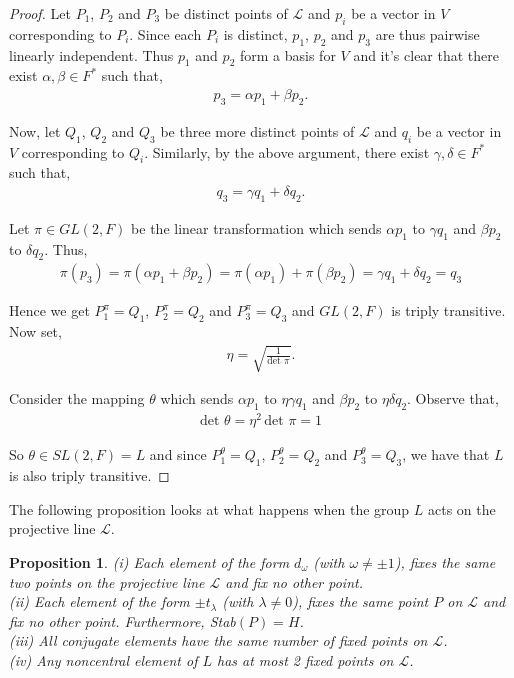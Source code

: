 \documentclass[a4paper , 11pt]{book}
\newtheorem{proposition}[theorem]{Proposition}
\theoremstyle{definition}
\theoremstyle{remark}
\begin{document}
\begin{proof} Let $P_1$, $P_2$ and $P_3$ be distinct points of $\mathscr{L}$ and $p_i$ be a vector in $V$ corresponding to $P_i$. Since each $P_i$ is distinct, $p_1$, $p_2$ and $p_3$ are thus pairwise linearly independent. Thus $p_1$ and $p_2$  form a basis for $V$ and it's clear that there exist $\alpha, \beta \in F^*$ such that,
\begin{align*} p_3 = \alpha p_1 + \beta p_2.
\end{align*}

Now, let $Q_1$, $Q_2$ and $Q_3$ be three more distinct points of $\mathscr{L}$ and $q_i$ be a vector in $V$ corresponding to $Q_i$. Similarly, by the above argument, there exist $\gamma, \delta \in F^*$ such that,
\begin{align*} q_3 = \gamma q_1 + \delta q_2.
\end{align*}

Let $\pi \in GL(2,F)$ be the linear transformation which sends $\alpha p_1$ to $\gamma q_1$  and $\beta p_2$ to $\delta q_2$. Thus,
\begin{align*} \pi(p_3) = \pi(\alpha p_1 + \beta p_2) = \pi(\alpha p_1) + \pi(\beta p_2) = \gamma q_1 + \delta q_2 = q_3 
\end{align*}

Hence we get $P^\pi_1 = Q_1$, $P^\pi_2 = Q_2$ and $P^\pi_3 = Q_3$ and $GL(2,F)$ is triply transitive. Now set,
\begin{align*} \eta = \sqrt{\frac{1}{\text{det }\pi}}.
\end{align*}

Consider the mapping $\theta$ which sends $\alpha p_1$ to $\eta \gamma q_1$ and $\beta p_2$ to $\eta \delta q_2$. Observe that,
\begin{align*} \text{det }\theta = \eta^2 \, \text{det } \pi = 1
\end{align*}

So $\theta \in SL(2,F) = L$ and since $P^\theta_1 = Q_1$, $P^\theta_2 = Q_2$ and $P^\theta_3 = Q_3$, we have that $L$ is also triply transitive. 

\end{proof}

The following proposition looks at what happens when the group $L$ acts on the projective line $\mathscr{L}$.

\begin{proposition} \label{6.7} (i) Each element of the form $d_\omega$ (with $\omega \neq \pm 1$), fixes the same two points on the projective line $\mathscr{L}$ and fix no other point. \vspace{3mm} \\
(ii) Each element of the form $\pm t_\lambda$ (with $\lambda \neq 0$), fixes the same point $P$ on $\mathscr{L}$ and fix no other point. Furthermore, \emph{Stab}$(P) = H$. \vspace{3mm} \\
(iii) All conjugate elements have the same number of fixed points on $\mathscr{L}$. \vspace{3mm} \\
(iv) Any noncentral element of $L$ has at most 2 fixed points on $\mathscr{L}$.
\end{proposition}
\end{document}

